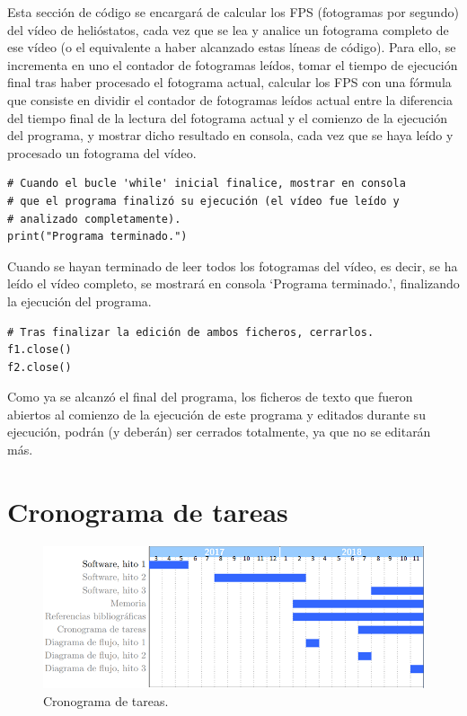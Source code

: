 Esta sección de código se encargará de calcular los FPS (fotogramas por segundo) del vídeo de helióstatos, cada vez que se lea y analice un fotograma completo de ese vídeo (o el equivalente a haber alcanzado estas líneas de código). Para ello, se incrementa en uno el contador de fotogramas leídos, tomar el tiempo de ejecución final tras haber procesado el fotograma actual, calcular los FPS con una fórmula que consiste en dividir el contador de fotogramas leídos actual entre la diferencia del tiempo final de la lectura del fotograma actual y el comienzo de la ejecución del programa, y mostrar dicho resultado en consola, cada vez que se haya leído y procesado un fotograma del vídeo.\\[20pt]

\begin{lstlisting}
# Cuando el bucle 'while' inicial finalice, mostrar en consola
# que el programa finalizó su ejecución (el vídeo fue leído y
# analizado completamente).
print("Programa terminado.")
\end{lstlisting}

Cuando se hayan terminado de leer todos los fotogramas del vídeo, es decir, se ha leído el vídeo completo, se mostrará en consola ‘Programa terminado.’, finalizando la ejecución del programa.\\[20pt]

\begin{lstlisting}
# Tras finalizar la edición de ambos ficheros, cerrarlos.
f1.close()
f2.close()
\end{lstlisting}

Como ya se alcanzó el final del programa, los ficheros de texto que fueron abiertos al comienzo de la ejecución de este programa y editados durante su ejecución, podrán (y deberán) ser cerrados totalmente, ya que no se editarán más.



\section{Cronograma de tareas}

\begin{figure}[h!]
  	\centering
	\includegraphics[width=\textwidth]{CronogramaTareas/cronogramaTareas.PNG}
	\caption{Cronograma de tareas.
	\label{fig:CronogramaTareas/cronogramaTareas.PNG}}
\end{figure}

